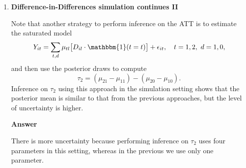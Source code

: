 \begin{enumerate}[leftmargin=*]
\item \textbf{Difference-in-Differences simulation continues II}

Note that another strategy to perform inference on the ATT is to estimate the saturated model
\[
Y_{it} = \sum_{t,d} \mu_{tl} \big[ D_{il} \cdot \mathbbm{1}(t = t) \big] + \epsilon_{it}, \quad t = 1, 2, \ d = 1, 0,
\]
and then use the posterior draws to compute
\[
\tau_2 = (\mu_{21} - \mu_{11}) - (\mu_{20} - \mu_{10}).
\]
Inference on $\tau_2$ using this approach in the simulation setting shows that the posterior mean is similar to that from the previous approaches, but the level of uncertainty is higher.

\textbf{Answer}

There is more uncertainty because performing inference on $\tau_2$ uses four parameters in this setting, whereas in the previous we use only one parameter.


\end{enumerate}
